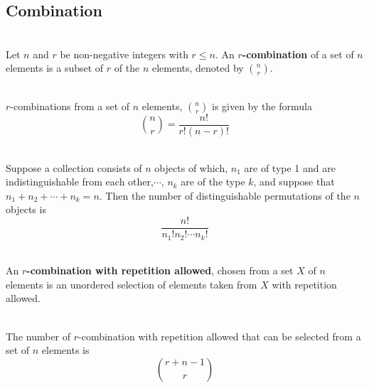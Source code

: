 \documentclass[12pt]{article}
\begin{document}
\subsection{Combination}
\begin{definition}[$r$-combination]
\hfill\\
\normalfont Let $n$ and $r$ be non-negative integers with $r\leq n$. An \textbf{$r$-combination} of a set of $n$ elements is a subset of $r$ of the $n$ elements, denoted by $\binom{n}{r}$.
\end{definition}
\begin{theorem}[9.5.1]
\hfill\\
\normalfont $r$-combinations from a set of $n$ elements, $\binom{n}{r}$ is given by the formula
\[
\binom{n}{r}=\frac{n!}{r!(n-r)!}
\]
\end{theorem}
\begin{theorem}
\hfill\\
\normalfont Suppose a collection consists of $n$ objects of which, $n_1$ are of type 1 and are indistinguishable from each other,$\cdots$, $n_k$ are of the type $k$, and suppose that $n_1+n_2+\cdots+n_k = n$. Then the number of distinguishable permutations of the $n$ objects is
\[
\frac{n!}{n_1!n_2!\cdots n_k!}
\]
\end{theorem}
\begin{definition}
\hfill\\
\normalfont An \textbf{$r$-combination with repetition allowed}, chosen from a set $X$ of $n$ elements is an unordered selection of elements taken from $X$ with repetition allowed. 
\end{definition}
\begin{theorem}[9.6.1]
\hfill\\
\normalfont The number of $r$-combination with repetition allowed that can be selected from a set of $n$ elements is 
\[
\binom{r+n-1}{r}
\]
\end{theorem}
\end{document}
